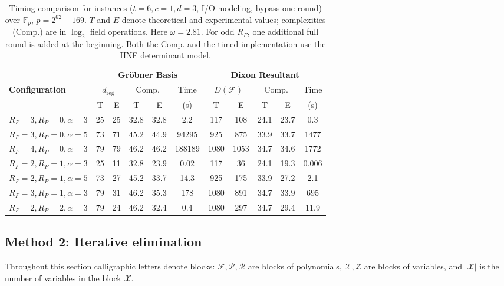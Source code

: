 \begin{table}[h]
\centering
\caption{Timing comparison for \poseidon instances ($t=6, c=1, d=3$, I/O modeling, bypass one round) over $\mathbb{F}_p$, $p = 2^{62}+169$. $T$ and $E$ denote theoretical and experimental values; complexities (Comp.) are in $\log_2$ field operations. Here $\omega = 2.81$. For odd $R_F$, one additional full round is added at the beginning. Both the Comp. and the timed implementation use the HNF determinant model.}
\label{tab:poseidon-timing}
\small
\setlength{\tabcolsep}{3.5pt}
\renewcommand{\arraystretch}{1.2}
\begin{tabular}{lcccccccccc}
\toprule
& \multicolumn{5}{c}{\textbf{Gr\"obner Basis}} & \multicolumn{5}{c}{\textbf{Dixon Resultant}} \\
\cmidrule(lr){2-6} \cmidrule(lr){7-11}
\textbf{Configuration} & \multicolumn{2}{c}{$d_{\mathrm{reg}}$} & \multicolumn{2}{c}{Comp.} & Time & \multicolumn{2}{c}{$D(\mathcal{F})$} & \multicolumn{2}{c}{Comp.} & Time \\
\cmidrule(lr){2-3} \cmidrule(lr){4-5} \cmidrule(lr){7-8} \cmidrule(lr){9-10}
& T & E & T & E & (s) & T & E & T & E & (s) \\
\midrule
$R_F=3, R_P=0, \alpha=3$      & 25  & 25 & 32.8 & 32.8 & 2.2      & 117  & 108  & 24.1 & 23.7 & 0.3    \\
$R_F=3, R_P=0, \alpha=5$      & 73  & 71 & 45.2 & 44.9 & 94295    & 925  & 875  & 33.9 & 33.7 & 1477   \\
$R_F=4, R_P=0, \alpha=3$      & 79  & 79 & 46.2 & 46.2 & 188189   & 1080 & 1053 & 34.7 & 34.6 & 1772   \\
\midrule
$R_F=2, R_P=1, \alpha=3$ & 25  & 11 & 32.8 & 23.9 & 0.02     & 117   & 36   & 24.1 & 19.3 & 0.006  \\
$R_F=2, R_P=1, \alpha=5$ & 73  & 27 & 45.2 & 33.7 & 14.3     & 925  & 175  & 33.9 & 27.2 & 2.1    \\
$R_F=3, R_P=1, \alpha=3$ & 79  & 31 & 46.2 & 35.3 & 178      & 1080 & 891  & 34.7 & 33.9 & 695   \\
$R_F=2, R_P=2, \alpha=3$ & 79  & 24 & 46.2 & 32.4 & 0.4      & 1080  & 297  & 34.7 & 29.4 & 11.9   \\
\bottomrule
\end{tabular}
\end{table}

\subsection{Method 2: Iterative elimination}\label{subsec:method2}
Throughout this section calligraphic letters denote blocks: $\mathcal{F},\mathcal{P},\mathcal{R}$ are blocks of polynomials, $\mathcal{X},\mathcal{Z}$ are blocks of variables, and $|\mathcal{X}|$ is the number of variables in the block $\mathcal{X}$.


